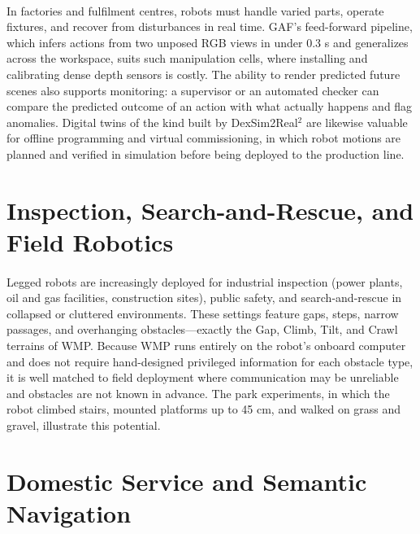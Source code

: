 \documentclass[12pt,a4paper,final]{extreport}
\begin{document}
\paragraph{} In factories and fulfilment centres, robots must handle varied parts, operate fixtures, and recover from disturbances in real time. GAF's feed-forward pipeline, which infers actions from two unposed RGB views in under 0.3 s and generalizes across the workspace, suits such manipulation cells, where installing and calibrating dense depth sensors is costly. The ability to render predicted future scenes also supports monitoring: a supervisor or an automated checker can compare the predicted outcome of an action with what actually happens and flag anomalies. Digital twins of the kind built by DexSim2Real$^2$ are likewise valuable for offline programming and virtual commissioning, in which robot motions are planned and verified in simulation before being deployed to the production line.

\section{Inspection, Search-and-Rescue, and Field Robotics}

\paragraph{} Legged robots are increasingly deployed for industrial inspection (power plants, oil and gas facilities, construction sites), public safety, and search-and-rescue in collapsed or cluttered environments. These settings feature gaps, steps, narrow passages, and overhanging obstacles---exactly the Gap, Climb, Tilt, and Crawl terrains of WMP. Because WMP runs entirely on the robot's onboard computer and does not require hand-designed privileged information for each obstacle type, it is well matched to field deployment where communication may be unreliable and obstacles are not known in advance. The park experiments, in which the robot climbed stairs, mounted platforms up to 45 cm, and walked on grass and gravel, illustrate this potential.

\section{Domestic Service and Semantic Navigation}
\end{document}
